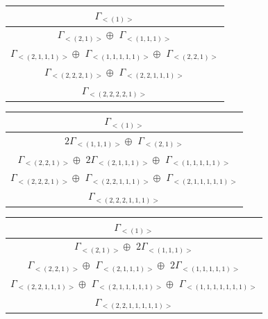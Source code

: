 \bigskip
\begin{minipage}{.5\textwidth}
\centering
\begin{tabular}{|c|}\hline
$\Gamma_{<(
1
)>}$
\\ \hline
$\Gamma_{<(
2 , 
1
)>} \oplus$
$\Gamma_{<(
1 , 
1 , 
1
)>}$
\\ \hline
$\Gamma_{<(
2 , 
1 , 
1 , 
1
)>} \oplus$
$\Gamma_{<(
1 , 
1 , 
1 , 
1 , 
1
)>} \oplus$
$\Gamma_{<(
2 , 
2 , 
1
)>}$
\\ \hline
$\Gamma_{<(
2 , 
2 , 
2 , 
1
)>} \oplus$
$\Gamma_{<(
2 , 
2 , 
1 , 
1 , 
1
)>}$
\\ \hline
$\Gamma_{<(
2 , 
2 , 
2 , 
2 , 
1
)>}$
\\
\hline\end{tabular}\end{minipage}
\begin{minipage}{.5\textwidth}
\centering
\begin{tabular}{|c|}\hline
$\Gamma_{<(
1
)>}$
\\ \hline
$ 2 \Gamma_{<(
1 , 
1 , 
1
)>} \oplus$
$\Gamma_{<(
2 , 
1
)>}$
\\ \hline
$\Gamma_{<(
2 , 
2 , 
1
)>} \oplus$
$ 2 \Gamma_{<(
2 , 
1 , 
1 , 
1
)>} \oplus$
$\Gamma_{<(
1 , 
1 , 
1 , 
1 , 
1
)>}$
\\ \hline
$\Gamma_{<(
2 , 
2 , 
2 , 
1
)>} \oplus$
$\Gamma_{<(
2 , 
2 , 
1 , 
1 , 
1
)>} \oplus$
$\Gamma_{<(
2 , 
1 , 
1 , 
1 , 
1 , 
1
)>}$
\\ \hline
$\Gamma_{<(
2 , 
2 , 
2 , 
1 , 
1 , 
1
)>}$
\\
\hline\end{tabular}\end{minipage}
\bigskip
\begin{minipage}{.5\textwidth}
\centering
\begin{tabular}{|c|}\hline
$\Gamma_{<(
1
)>}$
\\ \hline
$\Gamma_{<(
2 , 
1
)>} \oplus$
$ 2 \Gamma_{<(
1 , 
1 , 
1
)>}$
\\ \hline
$\Gamma_{<(
2 , 
2 , 
1
)>} \oplus$
$\Gamma_{<(
2 , 
1 , 
1 , 
1
)>} \oplus$
$ 2 \Gamma_{<(
1 , 
1 , 
1 , 
1 , 
1
)>}$
\\ \hline
$\Gamma_{<(
2 , 
2 , 
1 , 
1 , 
1
)>} \oplus$
$\Gamma_{<(
2 , 
1 , 
1 , 
1 , 
1 , 
1
)>} \oplus$
$\Gamma_{<(
1 , 
1 , 
1 , 
1 , 
1 , 
1 , 
1
)>}$
\\ \hline
$\Gamma_{<(
2 , 
2 , 
1 , 
1 , 
1 , 
1 , 
1
)>}$
\\
\hline\end{tabular}\end{minipage}
